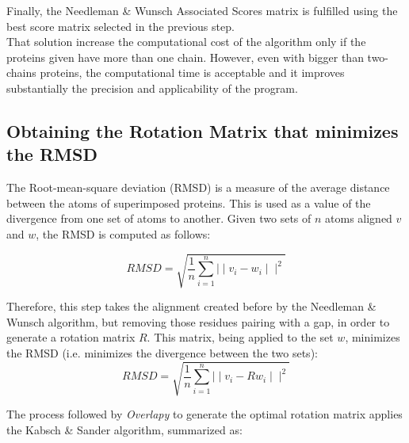 \documentclass{article}
\begin{document}
Finally, the Needleman \& Wunsch Associated Scores matrix is fulfilled using the best score matrix selected in the previous step.\\

That solution increase the computational cost of the algorithm only if the proteins given have more than one chain. However, even with bigger than two-chains proteins, the computational time is acceptable and it improves substantially the precision and applicability of the program. 


\subsection*{\color{gray}Obtaining the Rotation Matrix that minimizes the RMSD}
The Root-mean-square deviation (RMSD) is a measure of the average distance between the atoms of superimposed proteins. This is used as a value of the divergence from one set of atoms to another\cite{13}. Given two sets of $n$ atoms aligned $v$ and $w$, the RMSD is computed as follows:
 
$$RMSD=\sqrt{\frac{1}{n}\sum\limits_{i=1}^n{\mid\mid v_i - w_i\mid\mid^{2}}}$$

Therefore, this step takes the alignment created before by the Needleman \& Wunsch algorithm, but removing those residues pairing with a gap, in order to generate a rotation matrix $R$. This matrix, being applied to the set $w$, minimizes the RMSD (i.e. minimizes the divergence between the two sets):
$$RMSD=\sqrt{\frac{1}{n}\sum\limits_{i=1}^n{\mid\mid v_i - R w_i\mid\mid^{2}}}$$

The process followed by \textit{Overlapy} to generate the optimal rotation matrix applies the Kabsch \& Sander algorithm\cite{14}, summarized as:
\end{document}

